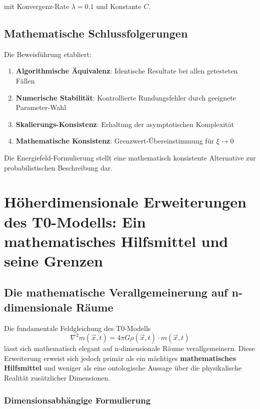 \documentclass[12pt,a4paper]{report}
\begin{document}
	mit Konvergenz-Rate $\lambda = 0.1$ und Konstante $C$.
	
	\subsection{Mathematische Schlussfolgerungen}
	
	Die Beweisführung etabliert:
	
	\begin{enumerate}
		\item \textbf{Algorithmische Äquivalenz}: Identische Resultate bei allen getesteten Fällen
		\item \textbf{Numerische Stabilität}: Kontrollierte Rundungsfehler durch geeignete Parameter-Wahl
		\item \textbf{Skalierungs-Konsistenz}: Erhaltung der asymptotischen Komplexität
		\item \textbf{Mathematische Konsistenz}: Grenzwert-Übereinstimmung für $\xi \to 0$
	\end{enumerate}
	
	Die Energiefeld-Formulierung stellt eine mathematisch konsistente Alternative zur probabilistischen Beschreibung dar.
	\section{Höherdimensionale Erweiterungen des T0-Modells: Ein mathematisches Hilfsmittel und seine Grenzen}
	
	\subsection{Die mathematische Verallgemeinerung auf n-dimensionale Räume}
	
	Die fundamentale Feldgleichung des T0-Modells 
	\begin{equation}
		\nabla^2 m(\vec{x},t) = 4\pi G \rho(\vec{x},t) \cdot m(\vec{x},t)
	\end{equation}
	lässt sich mathematisch elegant auf n-dimensionale Räume verallgemeinern. Diese Erweiterung erweist sich jedoch primär als ein mächtiges \textbf{mathematisches Hilfsmittel} und weniger als eine ontologische Aussage über die physikalische Realität zusätzlicher Dimensionen.
	
	\subsubsection{Dimensionsabhängige Formulierung}
	
\end{document}
